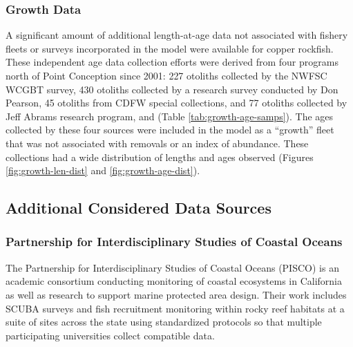 \documentclass[11pt,
  english,
  letterpaper,
]{article}
\begin{document}
\hypertarget{growth-data}{%
\subsubsection{Growth Data}\label{growth-data}}

A significant amount of additional length-at-age data not associated with fishery fleets or surveys incorporated in the model were available for copper rockfish. These independent age data collection efforts were derived from four programs north of Point Conception since 2001: 227 otoliths collected by the NWFSC WCGBT survey, 430 otoliths collected by a research survey conducted by Don Pearson, 45 otoliths from CDFW special collections, and 77 otoliths collected by Jeff Abrams research program, and (Table \ref{tab:growth-age-samps}). The ages collected by these four sources were included in the model as a ``growth'' fleet that was not associated with removals or an index of abundance. These collections had a wide distribution of lengths and ages observed (Figures \ref{fig:growth-len-dist} and \ref{fig:growth-age-dist}).

\hypertarget{additional-considered-data-sources}{%
\subsection{Additional Considered Data Sources}\label{additional-considered-data-sources}}

\hypertarget{partnership-for-interdisciplinary-studies-of-coastal-oceans}{%
\subsubsection{Partnership for Interdisciplinary Studies of Coastal Oceans}\label{partnership-for-interdisciplinary-studies-of-coastal-oceans}}

The Partnership for Interdisciplinary Studies of Coastal Oceans (PISCO) is an academic consortium conducting monitoring of coastal ecosystems in California as well as research to support marine protected area design. Their work includes SCUBA surveys and fish recruitment monitoring within rocky reef habitats at a suite of sites across the state using standardized protocols so that multiple participating universities collect compatible data.
\end{document}
